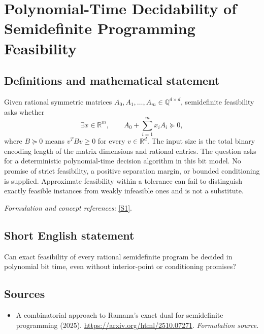 \documentclass[11pt]{article}
\begin{document}
\section*{\texorpdfstring{Polynomial-Time Decidability of Semidefinite Programming Feasibility}{Polynomial-Time Decidability of Semidefinite Programming Feasibility}}\label{30006825}
\subsection{Definitions and mathematical statement}
Given rational symmetric matrices $A_0,A_1,\ldots,A_m\in{\mathbb{Q}}^{d\times d}$, semidefinite feasibility asks whether
\[
 \exists x\in{\mathbb{R}}^m,\qquad A_0+\sum_{i=1}^m x_iA_i\succeq0,
\]
where $B\succeq0$ means $v^TBv\ge0$ for every $v\in{\mathbb{R}}^d$. The input size is the total binary encoding length of the matrix dimensions and rational entries. The question asks for a deterministic polynomial-time decision algorithm in this bit model. No promise of strict feasibility, a positive separation margin, or bounded conditioning is supplied. Approximate feasibility within a tolerance can fail to distinguish exactly feasible instances from weakly infeasible ones and is not a substitute.
\par\smallskip\textit{Formulation and concept references:} \href{https://arxiv.org/html/2510.07271}{[S1]}.

\subsection{Short English statement}
Can exact feasibility of every rational semidefinite program be decided in polynomial bit time, even without interior-point or conditioning promises?
\subsection{Sources}
\begin{itemize}
\item[S1]A combinatorial approach to Ramana's exact dual for semidefinite programming (2025).
\url{https://arxiv.org/html/2510.07271}.
\textit{Formulation source.}
\end{itemize}
\end{document}
